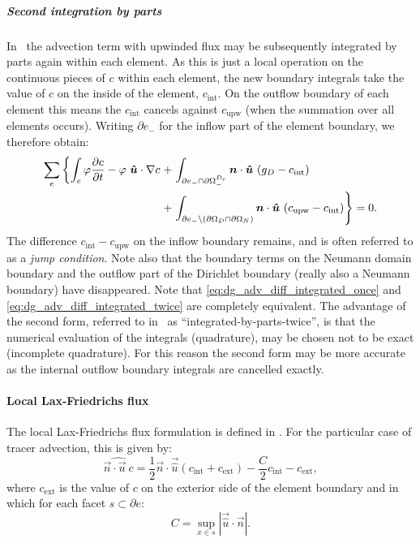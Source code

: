 \subparagraph{Second integration by parts}

In \fluidity\ the advection term with upwinded flux may be subsequently
integrated by parts again within each element. As this is just a local
operation on the continuous pieces of $c$ within each element, the new
boundary integrals take the value of $c$ on the inside of the element,
$c_{\mathrm{int}}$. On the outflow boundary of each element this means the
$c_{\mathrm{int}}$ cancels against $c_{\mathrm{upw}}$ (when the summation over all elements occurs).
Writing $\partial e_-$ for the inflow part of the element boundary, we therefore obtain:
\begin{equation}
\begin{split}
  \sum_e \left\{ \int_e \varphi \frac{\partial c}{\partial t}
  - \varphi~{\mbox{\boldmath$\hat u$}}\cdot\nabla c \right.
    +& \left. \int_{\partial e_- \cap\partial\Omega^{D_c}_-} {\mbox{\boldmath$n$}}\cdot{\mbox{\boldmath$\hat u$}}~(g_D -c_{\mathrm{int}}) \right. \\
    +& \left. \int_{\partial e_-\setminus (\partial\Omega_D\cap\partial\Omega_N)}
    {\mbox{\boldmath$n$}}\cdot{\mbox{\boldmath$\hat u$}}~
      (c_{\mathrm{upw}}-c_{\mathrm{int}}) \right\} =0.
    \label{eq:dg_adv_diff_integrated_twice}
\end{split}
\end{equation}
The difference $c_{\mathrm{int}}-c_{\mathrm{upw}}$ on the inflow boundary
remains, and is often referred to as a \emph{jump condition}. Note also that
the boundary terms on the Neumann domain boundary and the outflow part of
the Dirichlet boundary (really also a Neumann boundary) have disappeared.
Note that \eqref{eq:dg_adv_diff_integrated_once} and
\eqref{eq:dg_adv_diff_integrated_twice} are completely equivalent. The
advantage of the second form, referred to in \fluidity\ as
``integrated-by-parts-twice'', is that the numerical evaluation of the
integrals (quadrature), may be chosen not to be exact (incomplete quadrature). For this
reason the second form may be more accurate as the internal outflow boundary
integrals are cancelled exactly.

\paragraph{Local Lax-Friedrichs flux}

The local Lax-Friedrichs flux formulation is defined in
\citet[p208]{cockburn2001}. For the
particular case of tracer advection, this is given by:
\begin{equation}
  \widehat{\vec{n}\cdot\vec{u}~c}=\frac{1}{2}\vec{n}\cdot\vec{\hat u}
  \left(c_{\mathrm{int}}+c_{\mathrm{ext}}\right)
  -\frac{C}{2}c_{\mathrm{int}}-c_{\mathrm{ext}},
\end{equation}
where $c_{\mathrm{ext}}$ is the value of $c$ on the exterior side of the
  element boundary and in which for each facet $s\subset\partial e$:
\begin{equation}
  C= \sup_{x\in s}|\vec{\hat u}\cdot\vec{n}|.
\end{equation}


